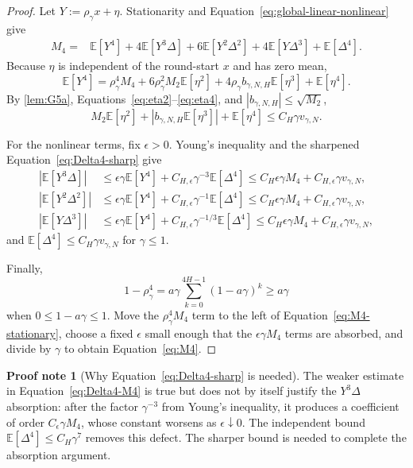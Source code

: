 \documentclass[11pt]{article}
\theoremstyle{definition}
\newtheorem{proofnote}[proofnote]{Proof note}
\newcommand{\E}{\mathbb{E}}
\newcommand{\fourthscale}{v_{\gamma,N}}
\newcommand{\bstat}{b_{\gamma,N,H}}
\begin{document}
\begin{proof}
Let $Y:=\rho_\gamma x+\eta$. Stationarity and Equation~\eqref{eq:global-linear-nonlinear} give
\begin{equation}
\label{eq:M4-stationary}
\begin{aligned}
  M_4={}&\E[Y^4]
  +4\E[Y^3\Delta]
  +6\E[Y^2\Delta^2]
  +4\E[Y\Delta^3]
  +\E[\Delta^4].
\end{aligned}
\end{equation}
Because $\eta$ is independent of the round-start $x$ and has zero mean,
\begin{equation}
\label{eq:Y4-expand}
  \E[Y^4]
  =\rho_\gamma^4M_4
   +6\rho_\gamma^2M_2\E[\eta^2]
   +4\rho_\gamma\bstat\E[\eta^3]
   +\E[\eta^4].
\end{equation}
By \cref{lem:G5a}, Equations~\eqref{eq:eta2}--\eqref{eq:eta4}, and $|\bstat|\le\sqrt{M_2}$,
\[
  M_2\E[\eta^2]+|\bstat\E[\eta^3]|+\E[\eta^4]
  \le C_H\gamma\fourthscale.
\]

For the nonlinear terms, fix $\epsilon>0$. Young's inequality and the sharpened Equation~\eqref{eq:Delta4-sharp} give
\begin{align*}
  |\E[Y^3\Delta]|
  &\le \epsilon\gamma\E[Y^4]+C_{H,\epsilon}\gamma^{-3}\E[\Delta^4]
   \le C_H\epsilon\gamma M_4+C_{H,\epsilon}\gamma\fourthscale,\\
  |\E[Y^2\Delta^2]|
  &\le \epsilon\gamma\E[Y^4]+C_{H,\epsilon}\gamma^{-1}\E[\Delta^4]
   \le C_H\epsilon\gamma M_4+C_{H,\epsilon}\gamma\fourthscale,\\
  |\E[Y\Delta^3]|
  &\le \epsilon\gamma\E[Y^4]+C_{H,\epsilon}\gamma^{-1/3}\E[\Delta^4]
   \le C_H\epsilon\gamma M_4+C_{H,\epsilon}\gamma\fourthscale,
\end{align*}
and $\E[\Delta^4]\le C_H\gamma\fourthscale$ for $\gamma\le1$.

Finally,
\[
  1-\rho_\gamma^4
  =a\gamma\sum_{k=0}^{4H-1}(1-a\gamma)^k
  \ge a\gamma
\]
when $0\le1-a\gamma\le1$. Move the $\rho_\gamma^4M_4$ term to the left of Equation~\eqref{eq:M4-stationary}, choose a fixed $\epsilon$ small enough that the $\epsilon\gamma M_4$ terms are absorbed, and divide by $\gamma$ to obtain Equation~\eqref{eq:M4}.
\end{proof}

\begin{proofnote}[Why Equation~\eqref{eq:Delta4-sharp} is needed]
The weaker estimate in Equation~\eqref{eq:Delta4-M4} is true but does not by itself justify the $Y^3\Delta$ absorption: after the factor $\gamma^{-3}$ from Young's inequality, it produces a coefficient of order $C_\epsilon\gamma M_4$, whose constant worsens as $\epsilon\downarrow0$. The independent bound $\E[\Delta^4]\le C_H\gamma^7$ removes this defect. The sharper bound is needed to complete the absorption argument.
\end{proofnote}
\end{document}
